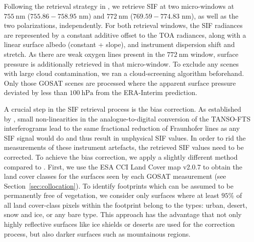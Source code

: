 \documentclass[preprint, a4paper, 10pt, times]{elsarticle}
\begin{document}
Following the retrieval strategy in \citet{Frankenberg2011}, we retrieve SIF at two micro-windows at $755\:\mathrm{nm}$ ($755.86 - 758.95$ nm) and $772\:\mathrm{nm}$ ($769.59 - 774.83$ nm), as well as the two polarizations, independently. For both retrieval windows, the SIF radiances are represented by a constant additive offset to the TOA radiances, along with a linear surface albedo (constant + slope), and instrument dispersion shift and stretch. As there are weak oxygen lines present in the $772\:\mathrm{nm}$ window, surface pressure is additionally retrieved in that micro-window. To exclude any scenes with large cloud contamination, we ran a cloud-screening algorithm beforehand. Only those GOSAT scenes are processed where the apparent surface pressure deviated by less than $100\:\mathrm{hPa}$ from the ERA-Interim prediction.

A crucial step in the SIF retrieval process is the bias correction. As established by \citet{Frankenberg2011}, small non-linearities in the analogue-to-digital conversion of the TANSO-FTS interferograms lead to the same fractional reduction of Fraunhofer lines as any SIF signal would do and thus result in unphysical SIF values. In order to rid the measurements of these instrument artefacts, the retrieved SIF values need to be corrected. To achieve the bias correction, we apply a slightly different method compared to \citet{Frankenberg2011}. First, we use the ESA CCI Land Cover map v2.0.7 \citep{Bontemps2013} to obtain the land cover classes for the surfaces seen by each GOSAT measurement (see Section~\ref{sec:collocation}). To identify footprints which can be assumed to be permanently free of vegetation, we consider only surfaces where at least $95\%$ of all land cover-class pixels within the footprint belong to the types: urban, desert, snow and ice, or any bare type. This approach has the advantage that not only highly reflective surfaces like ice shields or deserts are used for the correction process, but also darker surfaces such as mountainous regions.
\end{document}
